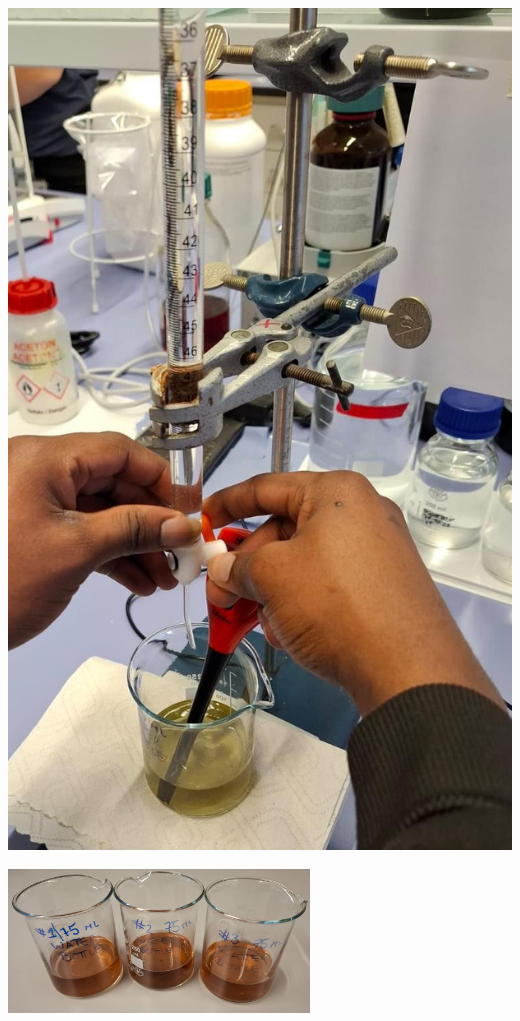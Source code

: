 \documentclass{article}
\begin{document}
\begin{minipage}[t]{\textwidth}
\begin{minipage}[t]{0.28\textwidth}
        \includegraphics[width=\textwidth]{media/tetration-process.jpeg}
        \label{fig:moment_titration}
    \end{minipage}
\end{minipage}

\vspace{0.7cm}

\begin{minipage}[t]{\textwidth}
    \centering
    \includegraphics[width=0.6\textwidth]{media/tap-with-ammonia.jpeg}
    \label{fig:solution_tap_ammonia}
\end{minipage}
\end{document}
